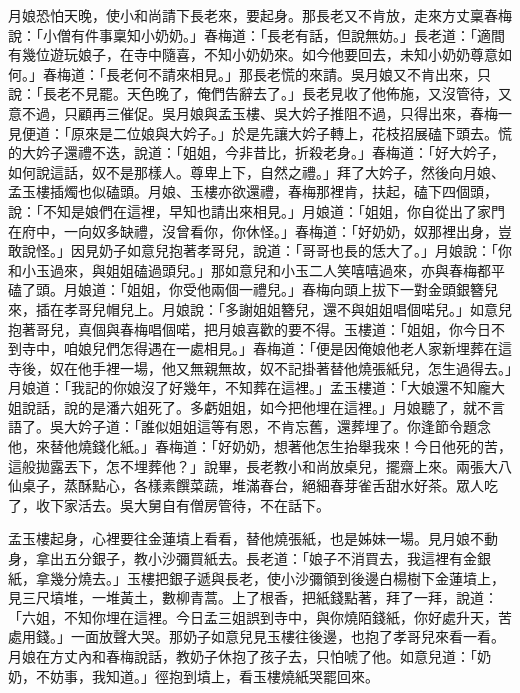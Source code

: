 月娘恐怕天晚，使小和尚請下長老來，要起身。那長老又不肯放，走來方丈稟春梅說：「小僧有件事稟知小奶奶。」春梅道：「長老有話，但說無妨。」長老道：「適間有幾位遊玩娘子，在寺中隨喜，不知小奶奶來。如今他要回去，未知小奶奶尊意如何。」春梅道：「長老何不請來相見。」那長老慌的來請。吳月娘又不肯出來，只說：「長老不見罷。天色晚了，俺們告辭去了。」長老見收了他佈施，又沒管待，又意不過，只顧再三催促。吳月娘與孟玉樓、吳大妗子推阻不過，只得出來，春梅一見便道：「原來是二位娘與大妗子。」於是先讓大妗子轉上，花枝招展磕下頭去。慌的大妗子還禮不迭，說道：「姐姐，今非昔比，折殺老身。」春梅道：「好大妗子，如何說這話，奴不是那樣人。尊卑上下，自然之禮。」拜了大妗子，然後向月娘、孟玉樓插燭也似磕頭。月娘、玉樓亦欲還禮，春梅那裡肯，扶起，磕下四個頭，說：「不知是娘們在這裡，早知也請出來相見。」月娘道：「姐姐，你自從出了家門在府中，一向奴多缺禮，沒曾看你，你休怪。」春梅道：「好奶奶，奴那裡出身，豈敢說怪。」因見奶子如意兒抱著孝哥兒，說道：「哥哥也長的恁大了。」月娘說：「你和小玉過來，與姐姐磕過頭兒。」那如意兒和小玉二人笑嘻嘻過來，亦與春梅都平磕了頭。月娘道：「姐姐，你受他兩個一禮兒。」春梅向頭上拔下一對金頭銀簪兒來，插在孝哥兒帽兒上。月娘說：「多謝姐姐簪兒，還不與姐姐唱個喏兒。」如意兒抱著哥兒，真個與春梅唱個喏，把月娘喜歡的要不得。玉樓道：「姐姐，你今日不到寺中，咱娘兒們怎得遇在一處相見。」春梅道：「便是因俺娘他老人家新埋葬在這寺後，奴在他手裡一場，他又無親無故，奴不記掛著替他燒張紙兒，怎生過得去。」月娘道：「我記的你娘沒了好幾年，不知葬在這裡。」孟玉樓道：「大娘還不知龐大姐說話，說的是潘六姐死了。多虧姐姐，如今把他埋在這裡。」月娘聽了，就不言語了。吳大妗子道：「誰似姐姐這等有恩，不肯忘舊，還葬埋了。你逢節令題念他，來替他燒錢化紙。」春梅道：「好奶奶，想著他怎生抬舉我來！今日他死的苦，這般拋露丟下，怎不埋葬他？」說畢，長老教小和尚放桌兒，擺齋上來。兩張大八仙桌子，蒸酥點心，各樣素饌菜蔬，堆滿春台，絕細春芽雀舌甜水好茶。眾人吃了，收下家活去。吳大舅自有僧房管待，不在話下。

孟玉樓起身，心裡要往金蓮墳上看看，替他燒張紙，也是姊妹一場。見月娘不動身，拿出五分銀子，教小沙彌買紙去。長老道：「娘子不消買去，我這裡有金銀紙，拿幾分燒去。」玉樓把銀子遞與長老，使小沙彌領到後邊白楊樹下金蓮墳上，見三尺墳堆，一堆黃土，數柳青蒿。上了根香，把紙錢點著，拜了一拜，說道：「六姐，不知你埋在這裡。今日孟三姐誤到寺中，與你燒陌錢紙，你好處升天，苦處用錢。」一面放聲大哭。那奶子如意兒見玉樓往後邊，也抱了孝哥兒來看一看。月娘在方丈內和春梅說話，教奶子休抱了孩子去，只怕唬了他。如意兒道：「奶奶，不妨事，我知道。」徑抱到墳上，看玉樓燒紙哭罷回來。


